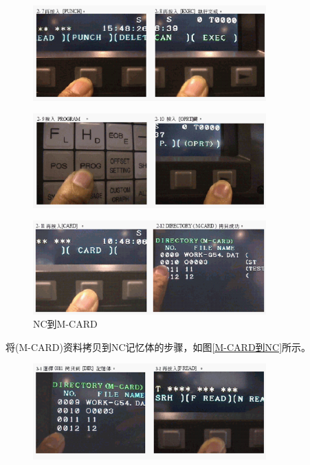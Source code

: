 \begin{figure}[!hbtp]
	\centering	\includegraphics[width=0.8\textwidth]{images/14-15}
\end{figure}

\begin{figure}[!hbtp]
	\centering	\includegraphics[width=0.8\textwidth]{images/14-16}
\end{figure}

\begin{figure}[!hbtp]
	\centering	\includegraphics[width=0.8\textwidth]{images/14-17}
	\caption{NC到M-CARD} \label{NC到M-CARD}
\end{figure}

将(M-CARD)资料拷贝到NC记忆体的步骤，如图\ref{M-CARD到NC}所示。

\begin{figure}[!hbtp]
	\centering	\includegraphics[width=0.8\textwidth]{images/14-18}
\end{figure}


